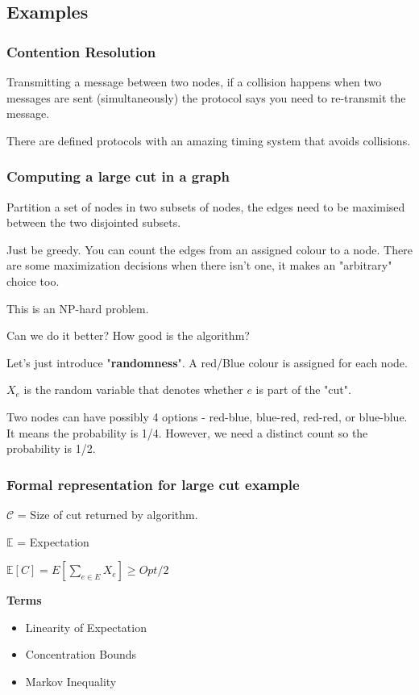 \documentclass{article}
\begin{document}
\subsection{Examples}

\subsubsection{Contention Resolution}

Transmitting a message between two nodes, if a collision happens when two messages are sent (simultaneously) the protocol says you need to re-transmit the message.

There are defined protocols with an amazing timing system that avoids collisions.

\subsubsection{Computing a large cut in a graph}

Partition a set of nodes in two subsets of nodes, the edges need to be maximised between the two disjointed subsets.

Just be greedy. You can count the edges from an assigned colour to a node. There are some maximization decisions when there isn't one, it makes an "arbitrary" choice too.

This is an NP-hard problem.

Can we do it better? How good is the algorithm?

Let's just introduce "\textbf{randomness}". A red/Blue colour is assigned for each node.

$X_e$ is the random variable that denotes whether $e$ is part of the "cut".

Two nodes can have possibly 4 options - red-blue, blue-red, red-red, or blue-blue. It means the probability is 1/4. However, we need a distinct count so the probability is 1/2.

\subsubsection{Formal representation for large cut example}

$\mathcal{C}$ = Size of cut returned by algorithm.

$\mathbb E$ = Expectation

$\mathbb E[C] = E[\sum_{e\in E} X_e] \geq Opt/2$

\textbf{Terms}
\begin{itemize}
    \item Linearity of Expectation
    \item Concentration Bounds
    \item Markov Inequality
\end{itemize}
\end{document}
